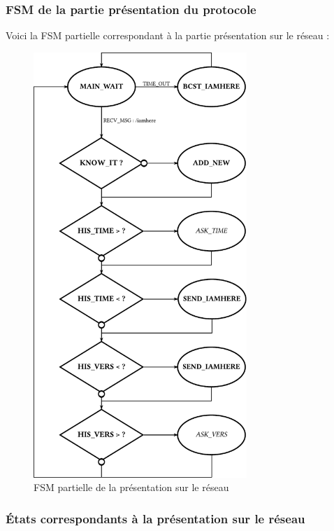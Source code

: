 \subsubsection{FSM de la partie présentation du protocole}
Voici la FSM partielle correspondant à la partie présentation sur le réseau :
\begin{figure}[htbp]
  \centering
  \includegraphics[width=0.72\textwidth]{figs/fsm_presentation.pdf}
  \caption{FSM partielle de la présentation sur le réseau}
  \label{fig:fsm_presentation}
  \vspace{-17pt}
\end{figure}
\newpage

\subsubsection{États correspondants à la présentation sur le réseau}


